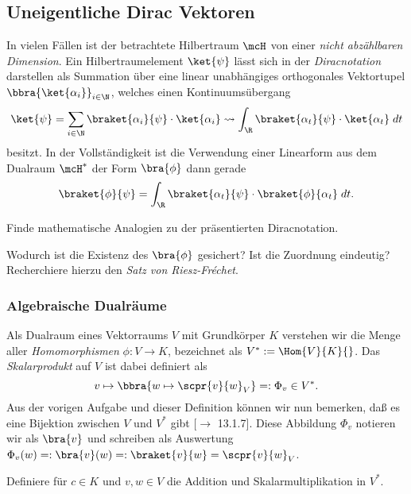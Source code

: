 \documentclass{subfiles}
\begin{document}
    \subsection{Uneigentliche Dirac Vektoren}
        In vielen Fällen ist der betrachtete Hilbertraum $\mcH$ von einer \emph{nicht abzählbaren Dimension}. 
        Ein Hilbertraumelement $\ket{\psi}$ lässt sich in der \emph{Diracnotation} darstellen als Summation über eine linear unabhängiges orthogonales Vektortupel $\bbra{\ket{\alpha_i}}_{i\in\N}$, welches einen Kontinuumsübergang
        \[
            \ket{\psi} = \sum_{i\in\N} \braket{\alpha_i}{\psi}\cdot\ket{\alpha_i}\leadsto \int_\R \braket{\alpha_t}{\psi}\cdot\ket{\alpha_t}\;dt
        \]
        besitzt. In der Vollständigkeit ist die Verwendung einer Linearform aus dem Dualraum $\mcH^*$ der Form $\bra{\phi}$ dann gerade
        \[
            \braket{\phi}{\psi} = \int_\R \braket{\alpha_t}{\psi}\cdot\braket{\phi}{\alpha_t}\;dt.
        \]
        \begin{Aufgabe}
            \nr{} Finde mathematische Analogien zu der präsentierten Diracnotation.

            \nr{} Wodurch ist die Existenz des $\bra{\phi}$ gesichert? Ist die Zuordnung eindeutig? Recherchiere hierzu den \emph{Satz von Riesz-Fréchet}.
        \end{Aufgabe}

        \subsubsection*{Algebraische Dualräume}
            Als Dualraum eines Vektorraums $V$ mit Grundkörper $K$ verstehen wir die Menge aller \emph{Homomorphismen} $\phi:V\to K$, bezeichnet als $V^*:=\Hom{V}{K}{}$. Das \emph{Skalarprodukt} auf $V$ ist dabei definiert als
            \[
                v\mapsto \bbra{w\mapsto \scpr{v}{w}_V} =: \Phi_v\in V^*.
            \]
            Aus der vorigen Aufgabe und dieser Definition können wir nun bemerken, daß es eine Bijektion zwischen $V$ und $V^*$ gibt [$\to$ 13.1.7]. Diese Abbildung $\Phi_v$ notieren wir als $\bra{v}$ und schreiben als Auswertung $\Phi_v(w) =: \bra{v}(w) =: \braket{v}{w} = \scpr{v}{w}_V$.
            \begin{Aufgabe}
                \nr{} Definiere für $c\in K$ und $v,w\in V$ die Addition und Skalarmultiplikation in $V^*$.
            \end{Aufgabe} 
\end{document}
